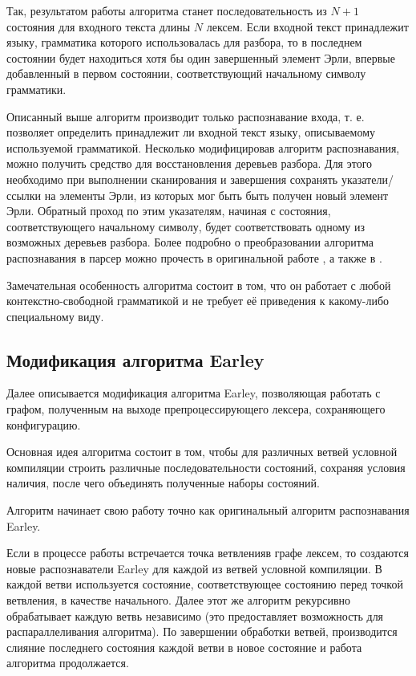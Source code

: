 Так, результатом работы алгоритма станет последовательность из $N+1$ состояния для входного текста длины $N$ лексем. Если входной текст принадлежит языку, грамматика которого использовалась для разбора, то в последнем состоянии будет находиться хотя бы один завершенный элемент Эрли, впервые добавленный в первом состоянии, соответствующий начальному символу грамматики.

Описанный выше алгоритм производит только распознавание входа, т. е. позволяет определить принадлежит ли входной текст языку, описываемому используемой грамматикой. Несколько модифицировав алгоритм распознавания, можно получить средство для восстановления деревьев разбора. Для этого необходимо при выполнении сканирования и завершения сохранять указатели/ссылки на элементы Эрли, из которых мог быть быть получен новый элемент Эрли. Обратный проход по этим указателям, начиная с состояния, соответствующего начальному символу, будет соответствовать одному из возможных деревьев разбора. Более подробно о преобразовании алгоритма распознавания в парсер можно прочесть в оригинальной работе \cite{earley68}, а также в \cite{recognizertoparser}.

Замечательная особенность алгоритма состоит в том, что он работает с любой контекстно-свободной грамматикой и не требует её приведения к какому-либо специальному виду.

\subsection{Модификация алгоритма Earley}
\label{subsec:earleymodification}


Далее описывается модификация алгоритма Earley, позволяющая работать с графом, полученным на выходе препроцессирующего лексера, сохраняющего конфигурацию. 

Основная идея алгоритма состоит в том, чтобы для различных ветвей условной компиляции строить различные последовательности состояний, сохраняя условия наличия, после чего объединять полученные наборы состояний.

Алгоритм начинает свою работу точно как оригинальный алгоритм распознавания Earley.

Если в процессе работы встречается точка ветвленияв графе лексем, то создаются новые распознаватели Earley для каждой из ветвей условной компиляции. В каждой ветви используется состояние, соответствующее состоянию перед точкой ветвления, в качестве начального. Далее этот же алгоритм рекурсивно обрабатывает каждую ветвь независимо (это предоставляет возможность для распараллеливания алгоритма). По завершении обработки ветвей, производится слияние последнего состояния каждой ветви в новое состояние и работа алгоритма продолжается.


